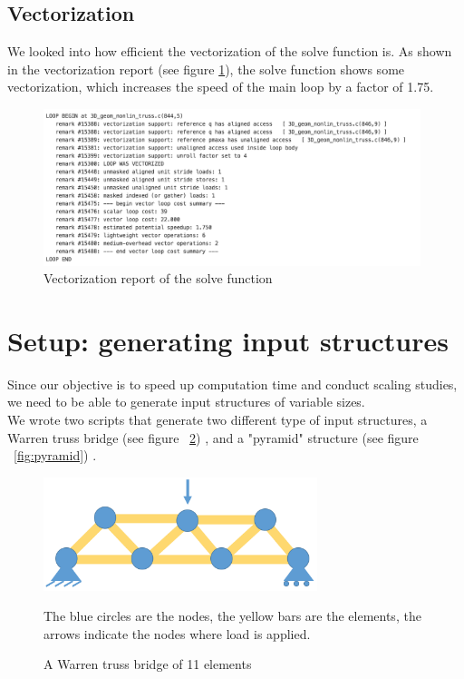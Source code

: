 \documentclass[11pt]{article}
\begin{document}
\subsection{Vectorization}
We looked into how efficient the vectorization of the solve function is. As shown in the vectorization report (see figure \ref{fig:vectorization}), the solve function shows some vectorization, which increases the speed of the main loop by a factor of 1.75. 

\begin{figure}[h]
	\begin{center}
		
		\includegraphics[width=11cm]{vectorization}
		\caption{Vectorization report of the solve function}
		\label{fig:vectorization}
	\end{center}
	
\end{figure}

\section{Setup: generating input structures}\label{sec:setup}

Since our objective is to speed up computation time and conduct scaling studies, we need to be able to generate input structures of variable sizes.\\

We wrote two scripts that generate two different type of input structures, a Warren truss bridge (see figure ~\ref{fig:chain}) , and a "pyramid" structure (see figure ~\ref{fig:pyramid}) .


\begin{figure}[h]
\begin{center}

\includegraphics[width=8cm]{chain}
\caption{A Warren truss bridge of 11 elements}
\label{fig:chain}
The blue circles are the nodes, the yellow bars are the elements, the arrows indicate the nodes where load is applied.
\end{center}

\end{figure}
\end{document}
